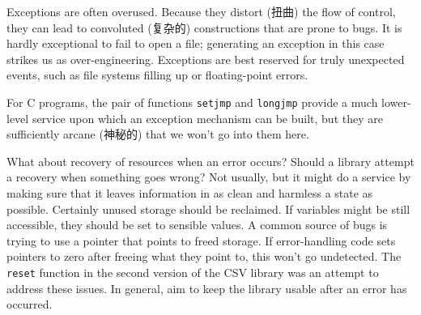 Exceptions are often overused. Because they distort (扭曲) the flow of
control, they can lead to convoluted (复杂的) constructions that are prone
to bugs. It is hardly exceptional to fail to open a file; generating an
exception in this case strikes us as over-engineering.  Exceptions are best
reserved for truly unexpected events, such as file systems filling up or
floating-point errors.

For C programs, the pair of functions \verb'setjmp' and \verb'longjmp'
provide a much lower-level service upon which an exception mechanism can be
built, but they are sufficiently arcane (神秘的) that we won't go into them
here.

What about recovery of resources when an error occurs? Should a library
attempt a recovery when something goes wrong? Not usually, but it might do
a service by making sure that it leaves information in as clean and
harmless a state as possible.  Certainly unused storage should be
reclaimed. If variables might be still accessible, they should be set to
sensible values. A common source of bugs is trying to use a pointer that
points to freed storage. If error-handling code sets pointers to zero after
freeing what they point to, this won't go undetected. The \verb'reset'
function in the second version of the CSV library was an attempt to address
these issues. In general, aim to keep the library usable after an error has
occurred.
